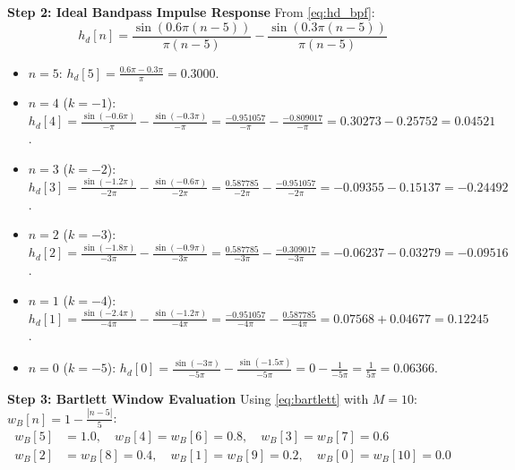 \documentclass[11pt,a4paper]{article}
\begin{document}
\vspace{1mm}
\noindent\textbf{Step 2: Ideal Bandpass Impulse Response}
From \eqref{eq:hd_bpf}:
\begin{equation}
h_d[n] = \frac{\sin(0.6\pi(n - 5))}{\pi(n - 5)} - \frac{\sin(0.3\pi(n - 5))}{\pi(n - 5)}
\end{equation}
\begin{itemize}
    \item $n = 5$: $h_d[5] = \frac{0.6\pi - 0.3\pi}{\pi} = \mathbf{0.3000}$.
    \item $n = 4$ ($k = -1$): $h_d[4] = \frac{\sin(-0.6\pi)}{-\pi} - \frac{\sin(-0.3\pi)}{-\pi} = \frac{-0.951057}{-\pi} - \frac{-0.809017}{-\pi} = 0.30273 - 0.25752 = \mathbf{0.04521}$.
    \item $n = 3$ ($k = -2$): $h_d[3] = \frac{\sin(-1.2\pi)}{-2\pi} - \frac{\sin(-0.6\pi)}{-2\pi} = \frac{0.587785}{-2\pi} - \frac{-0.951057}{-2\pi} = -0.09355 - 0.15137 = \mathbf{-0.24492}$.
    \item $n = 2$ ($k = -3$): $h_d[2] = \frac{\sin(-1.8\pi)}{-3\pi} - \frac{\sin(-0.9\pi)}{-3\pi} = \frac{0.587785}{-3\pi} - \frac{-0.309017}{-3\pi} = -0.06237 - 0.03279 = \mathbf{-0.09516}$.
    \item $n = 1$ ($k = -4$): $h_d[1] = \frac{\sin(-2.4\pi)}{-4\pi} - \frac{\sin(-1.2\pi)}{-4\pi} = \frac{-0.951057}{-4\pi} - \frac{0.587785}{-4\pi} = 0.07568 + 0.04677 = \mathbf{0.12245}$.
    \item $n = 0$ ($k = -5$): $h_d[0] = \frac{\sin(-3\pi)}{-5\pi} - \frac{\sin(-1.5\pi)}{-5\pi} = 0 - \frac{1}{-5\pi} = \frac{1}{5\pi} = \mathbf{0.06366}$.
\end{itemize}

\vspace{1mm}
\noindent\textbf{Step 3: Bartlett Window Evaluation}
Using \eqref{eq:bartlett} with $M = 10$: $w_B[n] = 1 - \frac{|n - 5|}{5}$:
\begin{align}
w_B[5] &= 1.0, \quad w_B[4] = w_B[6] = 0.8, \quad w_B[3] = w_B[7] = 0.6 \\
w_B[2] &= w_B[8] = 0.4, \quad w_B[1] = w_B[9] = 0.2, \quad w_B[0] = w_B[10] = 0.0
\end{align}
\end{document}
